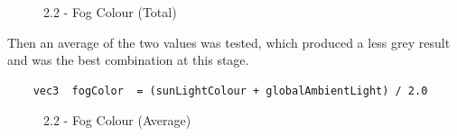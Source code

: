 \documentclass[a4 paper, 12pt]{article}
\begin{document}
\begin{figure} [H]
    \caption{2.2 - Fog Colour (Total)}   
\end{figure}

Then an average of the two values was tested, which produced a less grey result and was the best combination at this stage.
\begin{lstlisting}
    vec3  fogColor  = (sunLightColour + globalAmbientLight) / 2.0
\end{lstlisting}

\begin{figure} [H]
    \caption{2.2 - Fog Colour (Average)}   
\end{figure}
\end{document}
